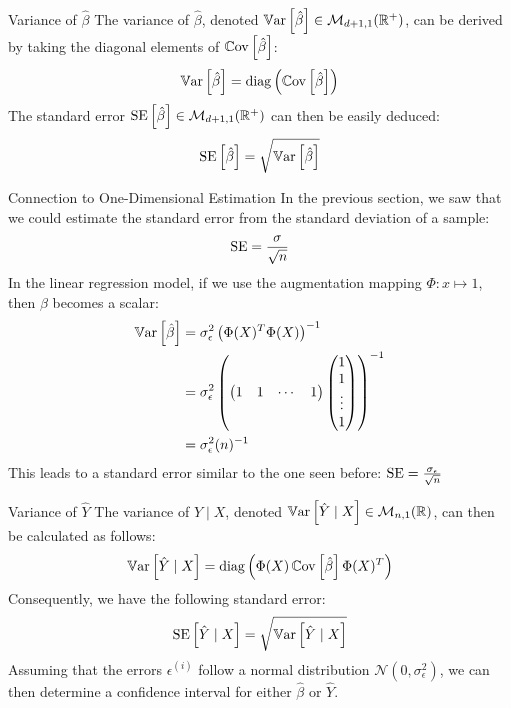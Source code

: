 \begin{frame}{Variance of $\hat{\beta}$}
	The variance of $\hat{\beta}$, denoted $\operatorname{\mathbb{V}ar}\left[\hat{\beta}\right] \in \mathcal{M}_{d+1, 1}(\mathbb{R}^+)$, can be derived by taking the diagonal elements of $\operatorname{\mathbb{C}ov}\left[\hat{\beta}\right]$:
	\begin{equation}
		\operatorname{\mathbb{V}ar}\left[\hat{\beta}\right] = \operatorname{diag}\left(\operatorname{\mathbb{C}ov}\left[\hat{\beta}\right]\right)
		\nonumber
	\end{equation}
	\pause
	The standard error $\ET[\hat{\beta}] \in \mathcal{M}_{d+1, 1}(\mathbb{R}^+)$ can then be easily deduced:
	\begin{equation}
		\ET[\hat{\beta}] = \sqrt{\Var{\hat{\beta}}}
		\nonumber
	\end{equation}
\end{frame}

\begin{frame}{Connection to One-Dimensional Estimation}
	In the previous section, we saw that we could estimate the standard error from the standard deviation of a sample:
	\begin{equation}
		\ET = \frac{\sigma}{\sqrt{n}}
		\nonumber
	\end{equation}
	In the linear regression model, if we use the augmentation mapping $\Phi: x \mapsto 1$, then $\beta$ becomes a scalar:
	\begin{equation}
		\begin{aligned}
			\operatorname{\mathbb{V}ar}\left[\hat{\beta}\right] &= \sigma_{\epsilon}^2 \left(\Phi(X)^T \Phi(X)\right)^{-1} \\
			&= \sigma_{\epsilon}^2 \left(\begin{pmatrix}
				1 & 1 & \cdots & 1
			\end{pmatrix}\begin{pmatrix}
				1 \\ 1 \\ \vdots \\ 1
			\end{pmatrix}
			\right)^{-1} \\
			&= \sigma_{\epsilon}^2 (n)^{-1}
		\end{aligned}
		\nonumber
	\end{equation}
	This leads to a standard error similar to the one seen before: $\ET = \frac{\sigma_{\epsilon}}{\sqrt{n}}$	
\end{frame}

\begin{frame}{Variance of $\hat{Y}$}
	The variance of $\hat{Y} \mid X$, denoted $\operatorname{\mathbb{V}ar}\left[\hat{Y} \mid X\right] \in \mathcal{M}_{n,1}(\mathbb{R})$, can then be calculated as follows:
	\begin{equation}
		\operatorname{\mathbb{V}ar}\left[\hat{Y} \mid X\right] = \operatorname{diag}\left(\Phi(X) \operatorname{\mathbb{C}ov}\left[\hat{\beta}\right] \Phi(X)^T\right)
		\nonumber
	\end{equation}
	\pause
	Consequently, we have the following standard error:
	\begin{equation}
		\ET[\hat{Y} \mid X] = \sqrt{\Var{\hat{Y} \mid X}}
		\nonumber
	\end{equation}	
	\pause
	Assuming that the errors $\epsilon^{(i)}$ follow a normal distribution $\mathcal{N}(0, \sigma_{\epsilon}^2)$, we can then determine a confidence interval for either $\hat{\beta}$ or $\hat{Y}$.
\end{frame}

